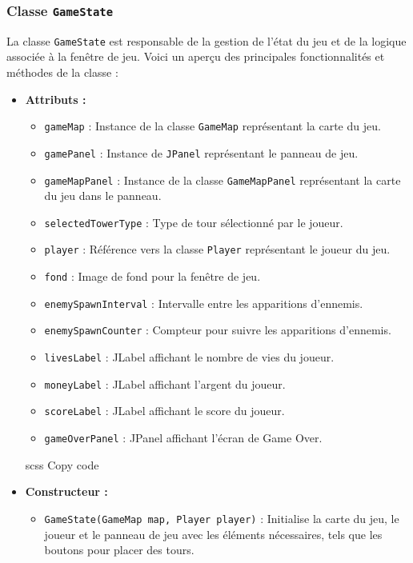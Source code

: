 \documentclass{article}
\begin{document}
\subsubsection{Classe \texttt{GameState}}

La classe \texttt{GameState} est responsable de la gestion de l'état du jeu et de la logique associée à la fenêtre de jeu. Voici un aperçu des principales fonctionnalités et méthodes de la classe :

\begin{itemize}
\item \textbf{Attributs :}
\begin{itemize}
\item \texttt{gameMap} : Instance de la classe \texttt{GameMap} représentant la carte du jeu.
\item \texttt{gamePanel} : Instance de \texttt{JPanel} représentant le panneau de jeu.
\item \texttt{gameMapPanel} : Instance de la classe \texttt{GameMapPanel} représentant la carte du jeu dans le panneau.
\item \texttt{selectedTowerType} : Type de tour sélectionné par le joueur.
\item \texttt{player} : Référence vers la classe \texttt{Player} représentant le joueur du jeu.
\item \texttt{fond} : Image de fond pour la fenêtre de jeu.
\item \texttt{enemySpawnInterval} : Intervalle entre les apparitions d'ennemis.
\item \texttt{enemySpawnCounter} : Compteur pour suivre les apparitions d'ennemis.
\item \texttt{livesLabel} : JLabel affichant le nombre de vies du joueur.
\item \texttt{moneyLabel} : JLabel affichant l'argent du joueur.
\item \texttt{scoreLabel} : JLabel affichant le score du joueur.
\item \texttt{gameOverPanel} : JPanel affichant l'écran de Game Over.
\end{itemize}

scss
Copy code
\item \textbf{Constructeur :}
\begin{itemize}
    \item \texttt{GameState(GameMap map, Player player)} : Initialise la carte du jeu, le joueur et le panneau de jeu avec les éléments nécessaires, tels que les boutons pour placer des tours.
\end{itemize}


\end{itemize}
\end{document}
